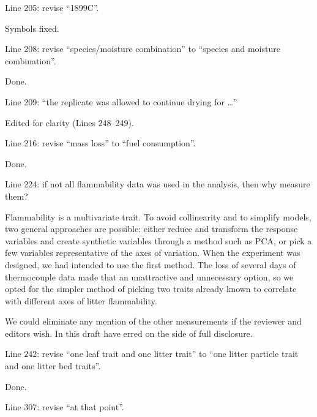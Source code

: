 \documentclass[letterpaper, 12pt]{letter}
\begin{document}
\begin{letter}{}
\begin{quoting}
Line 205: revise “1899C”.
\end{quoting}

Symbols fixed.

\begin{quoting}
  Line 208: revise “species/moisture combination” to “species and moisture
  combination”.
\end{quoting}

Done.

\begin{quoting}
  Line 209: “the replicate was allowed to continue drying for …”
\end{quoting}

Edited for clarity (Lines 248--249).

\begin{quoting}
  Line 216: revise “mass loss” to “fuel consumption”.
\end{quoting}

Done.

\begin{quoting}
  Line 224: if not all flammability data was used in the analysis, then why
  measure them?
\end{quoting}

Flammability is a multivariate trait. To avoid collinearity and to simplify
models, two general approaches are possible: either reduce and transform the
response variables and create synthetic variables through a method such as PCA,
or pick a few variables representative of the axes of variation. When the
experiment was designed, we had intended to use the first method. The loss of
several days of thermocouple data made that an unattractive and unnecessary
option, so we opted for the simpler method of picking two traits already known
to correlate with different axes of litter flammability.

We could eliminate any mention of the other measurements if the reviewer and
editors wish. In this draft have erred on the side of full disclosure.

\begin{quoting}
  Line 242: revise “one leaf trait and one litter trait” to “one litter
  particle trait and one litter bed traits”.
\end{quoting}

Done.

\begin{quoting}
  Line 307: revise “at that point”.
\end{quoting}


\end{letter}
\end{document}
